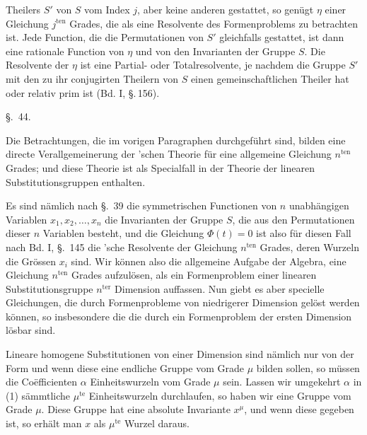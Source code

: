 Theilers $S'$ von $S$ vom Index $j$, aber keine anderen gestattet, so
genügt $\eta$ einer Gleichung $j^{\mathrm{ten}}$ Grades, die als eine Resolvente
des Formenproblems zu betrachten ist. Jede Function, die die
Permutationen von $S'$ gleichfalls gestattet, ist dann eine rationale
Function von $\eta$ und von den Invarianten der Gruppe $S$. Die
Resolvente der $\eta$ ist eine Partial- oder Totalresolvente, je
nachdem die Gruppe $S'$ mit den zu ihr conjugirten Theilern
von $S$ einen gemeinschaftlichen Theiler hat oder relativ prim
ist (Bd. I, \S.\,156).

\begin{center}
\S.\ 44.

\end{center}

Die Betrachtungen, die im vorigen Paragraphen durchgeführt
sind, bilden eine directe Verallgemeinerung der 'schen
Theorie für eine allgemeine Gleichung $n^{\mathrm{ten}}$ Grades; und diese
Theorie ist als Specialfall in der Theorie der linearen Substitutionsgruppen enthalten.

Es sind nämlich nach \S.\ 39 die symmetrischen Functionen
von $n$ unabhängigen Variablen $x_1, x_2, \ldots, x_n$ die Invarianten der
Gruppe $S$, die aus den Permutationen dieser $n$ Variablen besteht,
und die Gleichung $\Phi(t) = 0$ ist also für diesen Fall nach Bd. I,
\S.\ 145 die 'sche Resolvente der Gleichung $n^{\mathrm{ten}}$ Grades,
deren Wurzeln die Grössen $x_i$ sind. Wir können also die allgemeine Aufgabe der Algebra, eine Gleichung $n^{\mathrm{ten}}$ Grades aufzulösen, als ein Formenproblem einer linearen Substitutionsgruppe
$n^{\mathrm{ter}}$ Dimension auffassen. Nun giebt es aber specielle Gleichungen, die durch Formenprobleme von niedrigerer Dimension
gelöst werden können, so insbesondere die 
die durch ein Formenproblem der ersten Dimension lösbar sind.

Lineare homogene Substitutionen von einer Dimension sind
nämlich nur von der Form
und wenn diese eine endliche Gruppe vom Grade $\mu$ bilden sollen,
so müssen die Co\"efficienten $\alpha$ Einheitswurzeln vom Grade $\mu$ sein.
Lassen wir umgekehrt $\alpha$ in (1) sämmtliche $\mu^{\mathrm{te}}$ Einheitswurzeln
durchlaufen, so haben wir eine Gruppe vom Grade $\mu$. Diese
Gruppe hat eine absolute Invariante $x^{\mu}$, und wenn diese gegeben
ist, so erhält man $x$ als $\mu^{\mathrm{te}}$ Wurzel daraus.

